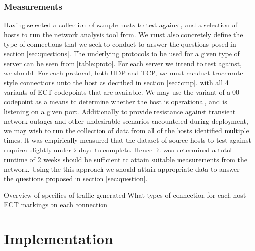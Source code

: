 \documentclass{l4proj}
\begin{document}
\subsection{Measurements}

Having selected a collection of sample hosts to test against, and a selection of hosts to run the network analysis tool from. We must also concretely define the type of connections that we seek to conduct to answer the questions posed in section \ref{sec:questions}. The underlying protocols to be used for a given type of server can be seen from \ref{table:proto}. For each server we intend to test against, we should. For each protocol, both UDP and TCP, we must conduct traceroute style connections unto the host as decribed in section \ref{sec:icmp}. with all 4 variants of ECT codepoints that are available. We may use the variant of a 00 codepoint as a means to determine whether the host is operational, and is listening on a given port. Additionally to provide resistance against transient network outages and other undesirable scenarios encountered during deployment, we may wish to run the collection of data from all of the hosts identified multiple times. It was empirically measured that the dataset of source hosts to test against requires slightly under 2 days to complete. Hence, it was determined a total runtime of 2 weeks should be sufficient to attain suitable measurements from the network. Using the this approach we should attain appropriate data to answer the questions proposed in section \ref{sec:question}.


{{Overview of specifics of traffic generated}}
{{What types of connection for each host}}
{{ECT markings on each connection}}






\chapter{Implementation}
\end{document}
